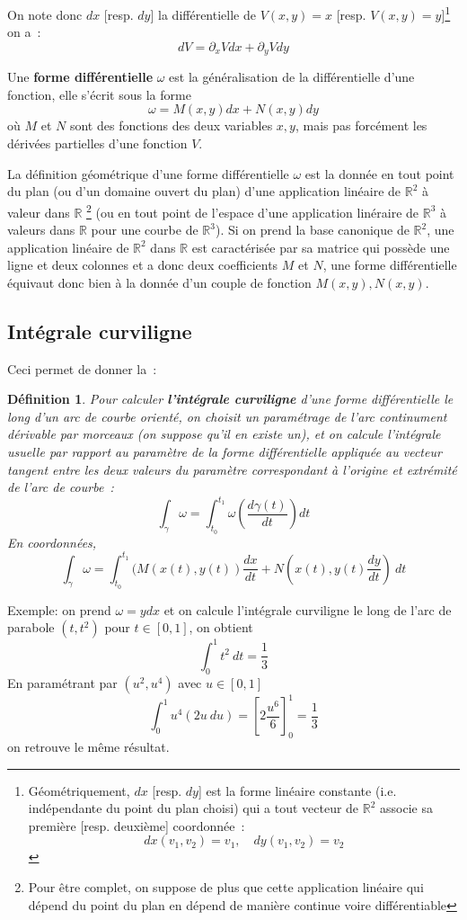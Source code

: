 \documentclass[a4paper,11pt]{article}
\newtheorem{defn}[thm]{D\'efinition}
\newcommand{\R}{{\mathbb{R}}}
\begin{document}
\begin{giacjshere}
On note donc $dx$ [resp. $dy$] la diff\'erentielle de
$V(x,y)=x$ [resp. $V(x,y)=y$]\footnote{G\'eom\'etriquement,
$dx$ [resp. $dy$] est la forme lin\'eaire constante
(i.e. ind\'ependante du point du plan choisi) qui a tout vecteur de
$\R^2$ associe sa premi\`ere [resp. deuxi\`eme] coordonn\'ee~:
$$ dx(v_1,v_2)=v_1, \quad dy(v_1,v_2)=v_2 $$}
on a~:
$$ dV=\partial_xV dx + \partial_yV dy$$

Une {\bf forme 
diff\'erentielle}
$\omega$ est la g\'en\'eralisation
de la diff\'erentielle d'une fonction, elle s'\'ecrit sous la forme
$$ \omega=M(x,y) dx + N(x,y) dy$$
o\`u $M$ et $N$ sont des fonctions 
des deux variables $x,y$, mais pas forc\'ement les d\'eriv\'ees
partielles d'une fonction $V$.
 
La d\'efinition g\'eom\'etrique d'une forme diff\'erentielle $\omega$
est la donn\'ee en tout point du plan (ou d'un domaine ouvert
du plan) d'une application lin\'eaire de $\R^2$ \`a valeur dans $\R$
\footnote{Pour \^etre complet, on suppose de plus que cette application
lin\'eaire qui d\'epend du point du plan en d\'epend de mani\`ere 
continue voire diff\'erentiable}
(ou en tout point de l'espace d'une application lin\'eraire de $\R^3$
\`a valeurs dans $\R$ pour une courbe de $\R^3$). 
Si on prend la base canonique de $\R^2$,
une application lin\'eaire de $\R^2$ dans $\R$ est caract\'eris\'ee
par sa matrice qui poss\`ede une ligne et deux colonnes et
a donc deux coefficients $M$ et $N$, une forme diff\'erentielle
\'equivaut donc bien \`a la donn\'ee d'un couple de fonction 
$M(x,y),N(x,y)$.

\subsection{Int\'egrale curviligne}
Ceci permet de donner la~:
\begin{defn}
Pour calculer {\bf l'int\'egrale 
curviligne}
 d'une forme diff\'erentielle 
le long d'un arc de courbe orient\'e,
on choisit un param\'etrage de l'arc continument d\'erivable par morceaux
(on suppose qu'il en existe un), 
et on calcule l'int\'egrale usuelle par rapport au param\`etre
de la forme diff\'erentielle appliqu\'ee au vecteur tangent entre les
deux valeurs du param\`etre correspondant \`a l'origine
et extr\'emit\'e de l'arc de courbe~:
$$ \int_\gamma \omega = \int_{t_0}^{t_1}
\omega\left(\frac{d\gamma(t)}{dt}\right) dt $$
En coordonn\'ees,
$$ \int_\gamma \omega =\int_{t_0}^{t_1} 
(M(x(t),y(t)) \frac{dx}{dt} + N(x(t),y(t) \frac{dy}{dt}) \ dt$$
\end{defn}
Exemple: on prend $\omega=ydx$ et on calcule l'int\'egrale
curviligne le long de l'arc de parabole $(t,t^2)$ pour $t\in[0,1]$,
on obtient
$$ \int_0^1 t^2 \ dt =\frac13$$
En param\'etrant par $(u^2,u^4)$ avec $u\in[0,1]$
$$ \int_0^1 u^4 (2u \ du) = \left[2\frac{u^6}{6}\right]_0^1=\frac13$$
on retrouve le m\^eme r\'esultat.


\end{giacjshere}
\end{document}
